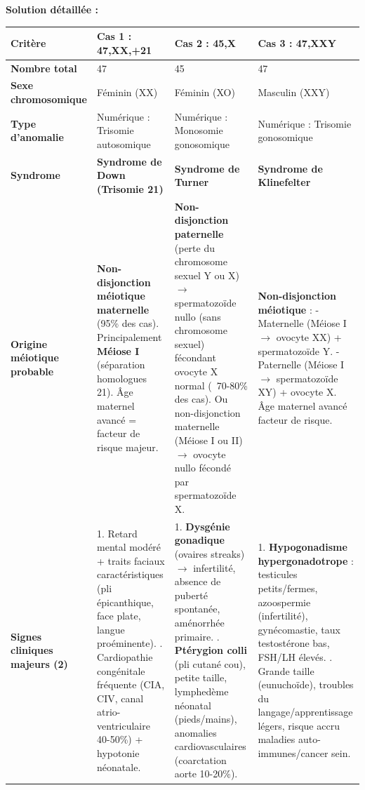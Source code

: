\documentclass[11pt]{article}
\begin{document}
\begin{exoresolu}
    \tcblower
    \textbf{Solution détaillée :}
    \begin{center}
    \begin{tabularx}{\linewidth}{|l|X|X|X|}\hline
    \rowcolor{popblueL}
    \textbf{Critère} & \textbf{Cas 1 : 47,XX,+21} & \textbf{Cas 2 : 45,X} & \textbf{Cas 3 : 47,XXY} \\ \hline
    \textbf{Nombre total} & 47 & 45 & 47 \\ \hline
    \textbf{Sexe chromosomique} & Féminin (XX) & Féminin (XO) & Masculin (XXY) \\ \hline
    \textbf{Type d'anomalie} & Numérique : Trisomie autosomique & Numérique : Monosomie gonosomique & Numérique : Trisomie gonosomique \\ \hline
    \textbf{Syndrome} & \textbf{Syndrome de Down (Trisomie 21)} & \textbf{Syndrome de Turner} & \textbf{Syndrome de Klinefelter} \\ \hline
    \textbf{Origine méiotique probable} & \textbf{Non-disjonction méiotique maternelle} (95\% des cas). \newline Principalement \textbf{Méiose I} (séparation homologues 21). Âge maternel avancé = facteur de risque majeur. & \textbf{Non-disjonction paternelle} (perte du chromosome sexuel Y ou X) $\rightarrow$ spermatozoïde nullo (sans chromosome sexuel) fécondant ovocyte X normal (~70-80\% des cas). \newline Ou non-disjonction maternelle (Méiose I ou II) $\rightarrow$ ovocyte nullo fécondé par spermatozoïde X. & \textbf{Non-disjonction méiotique} : \newline - Maternelle (Méiose I $\rightarrow$ ovocyte XX) + spermatozoïde Y. \newline - Paternelle (Méiose I $\rightarrow$ spermatozoïde XY) + ovocyte X. \newline Âge maternel avancé facteur de risque. \\ \hline
    \textbf{Signes cliniques majeurs (2)} & 1. Retard mental modéré + traits faciaux caractéristiques (pli épicanthique, face plate, langue proéminente). \newline 2. Cardiopathie congénitale fréquente (CIA, CIV, canal atrio-ventriculaire 40-50\%) + hypotonie néonatale. & 1. \textbf{Dysgénie gonadique} (ovaires streaks) $\rightarrow$ infertilité, absence de puberté spontanée, aménorrhée primaire. \newline 2. \textbf{Ptérygion colli} (pli cutané cou), petite taille, lymphedème néonatal (pieds/mains), anomalies cardiovasculaires (coarctation aorte 10-20\%). & 1. \textbf{Hypogonadisme hypergonadotrope} : testicules petits/fermes, azoospermie (infertilité), gynécomastie, taux testostérone bas, FSH/LH élevés. \newline 2. Grande taille (eunuchoïde), troubles du langage/apprentissage légers, risque accru maladies auto-immunes/cancer sein. \\ \hline

\end{tabularx}
\end{center}
\end{exoresolu}
\end{document}
